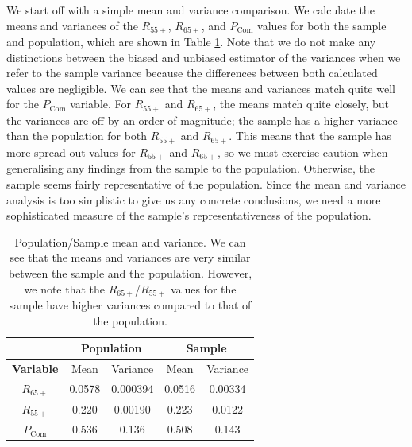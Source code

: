 \documentclass[11pt]{article}
\begin{document}
We start off with a simple mean and variance comparison.  We calculate the means and variances of the  $R_{55+}$, $R_{65+}$, and $P_{\text{Com}}$ values for both the sample and population, which are shown in Table \ref{tab:mean and variance}. Note that we do not make any distinctions between the biased and unbiased estimator of the variances when we refer to the sample variance because the differences between both calculated values are negligible. We can see that the means and variances match quite well for the $P_{\text{Com}}$ variable. For  $R_{55+}$ and $R_{65+}$, the means match quite closely, but the variances are off by an order of magnitude; the sample has a higher variance than the population for both $R_{55+}$ and $R_{65+}$. This means that the sample has more spread-out values for $R_{55+}$ and $R_{65+}$, so we must exercise caution when generalising any findings from the sample to the population. Otherwise, the sample seems fairly representative of the population. Since the mean and variance analysis is too simplistic to give us any concrete conclusions, we need a more sophisticated measure of the sample's representativeness of the population.


\begin{table}[]
\centering
\begin{tabular}{@{}ccccc@{}}
\toprule
\multicolumn{1}{l}{} & \multicolumn{2}{c}{\textbf{Population}} & \multicolumn{2}{c}{\textbf{Sample}} \\ \midrule
\textbf{Variable}    & Mean              & Variance            & Mean            & Variance          \\ \midrule
$R_{65+}$                   & 0.0578            & 0.000394            & 0.0516          & 0.00334           \\
$R_{55+}$                   & 0.220             & 0.00190             & 0.223           & 0.0122            \\
$P_{\text{Com}}$                 & 0.536             & 0.136               & 0.508           & 0.143            \\ \bottomrule
\end{tabular}
\caption{Population/Sample mean and variance. We can see that the means and variances are very similar between the sample and the population. However, we note that the $R_{65+}$/$R_{55+}$ values for the sample have higher variances compared to that of the population.}
\label{tab:mean and variance}
\end{table}
\end{document}
